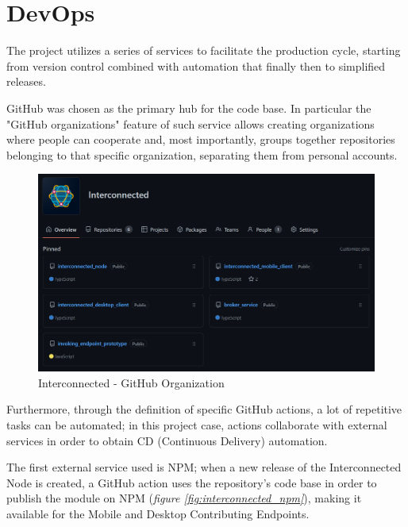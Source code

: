 \section{DevOps}\label{devops}
The project utilizes a series of services to facilitate the production cycle, starting from version control combined with automation that finally then to simplified releases.

GitHub was chosen as the primary hub for the code base. In particular the "GitHub organizations" feature of such service allows creating organizations where people can cooperate and, most importantly, groups together repositories belonging to that specific organization, separating them from personal accounts.

\begin{figure}[!ht]
    \centering
    \includegraphics[width=\linewidth]{document/chapters/chapter_7/images/interconnected_organization.png}
    \caption{Interconnected - GitHub Organization}
    \label{fig:interconnected_organization}
\end{figure}

Furthermore, through the definition of specific GitHub actions, a lot of repetitive tasks can be automated; in this project case, actions collaborate with external services in order to obtain CD (Continuous Delivery) automation.

The first external service used is NPM; when a new release of the Interconnected Node is created, a GitHub action uses the repository's code base in order to publish the module on NPM (\textit{figure \ref{fig:interconnected_npm}}), making it available for the Mobile and Desktop Contributing Endpoints.

